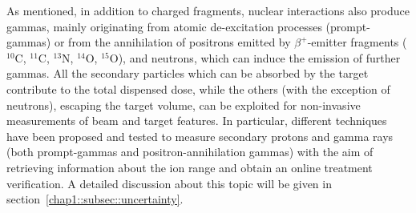 As mentioned, in addition to charged fragments, nuclear interactions also produce gammas, mainly originating from atomic de-excitation processes (prompt-gammas) or from the annihilation of positrons emitted by $\beta^+$-emitter fragments ($^{10}$C, $^{11}$C, $^{13}$N, $^{14}$O, $^{15}$O), and neutrons, which can induce the emission of further gammas. All the secondary particles which can be absorbed by the target contribute to the total dispensed dose, while the others (with the exception of neutrons), escaping the target volume, can be exploited for non-invasive measurements of beam and target features. In particular, different techniques have been proposed and tested to measure secondary protons and gamma rays (both prompt-gammas and positron-annihilation gammas) with the aim of retrieving information about the ion range and obtain an online treatment verification. A detailed discussion about this topic will be given in section~\ref{chap1::subsec::uncertainty}.

